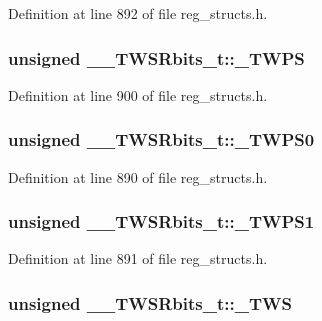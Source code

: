 Definition at line 892 of file reg\+\_\+structs.\+h.

\hypertarget{union_____t_w_s_rbits__t_afee5a81e9a9b2775177c090c345a2bfb}{
\subsubsection[{\+\_\+\+T\+W\+P\+S}]{\setlength{\rightskip}{0pt plus 5cm}unsigned \+\_\+\+\_\+\+T\+W\+S\+Rbits\+\_\+t\+::\+\_\+\+T\+W\+P\+S}}\label{union_____t_w_s_rbits__t_afee5a81e9a9b2775177c090c345a2bfb}


Definition at line 900 of file reg\+\_\+structs.\+h.

\hypertarget{union_____t_w_s_rbits__t_a29b3e5b90d3ce3c2da477f7e76a447fa}{
\subsubsection[{\+\_\+\+T\+W\+P\+S0}]{\setlength{\rightskip}{0pt plus 5cm}unsigned \+\_\+\+\_\+\+T\+W\+S\+Rbits\+\_\+t\+::\+\_\+\+T\+W\+P\+S0}}\label{union_____t_w_s_rbits__t_a29b3e5b90d3ce3c2da477f7e76a447fa}


Definition at line 890 of file reg\+\_\+structs.\+h.

\hypertarget{union_____t_w_s_rbits__t_a89ed4e4513aa2a990fd7d2696932d960}{
\subsubsection[{\+\_\+\+T\+W\+P\+S1}]{\setlength{\rightskip}{0pt plus 5cm}unsigned \+\_\+\+\_\+\+T\+W\+S\+Rbits\+\_\+t\+::\+\_\+\+T\+W\+P\+S1}}\label{union_____t_w_s_rbits__t_a89ed4e4513aa2a990fd7d2696932d960}


Definition at line 891 of file reg\+\_\+structs.\+h.

\hypertarget{union_____t_w_s_rbits__t_afbb3a61de0c47a3a9097b4ccf84a0a8e}{
\subsubsection[{\+\_\+\+T\+W\+S}]{\setlength{\rightskip}{0pt plus 5cm}unsigned \+\_\+\+\_\+\+T\+W\+S\+Rbits\+\_\+t\+::\+\_\+\+T\+W\+S}}\label{union_____t_w_s_rbits__t_afbb3a61de0c47a3a9097b4ccf84a0a8e}


